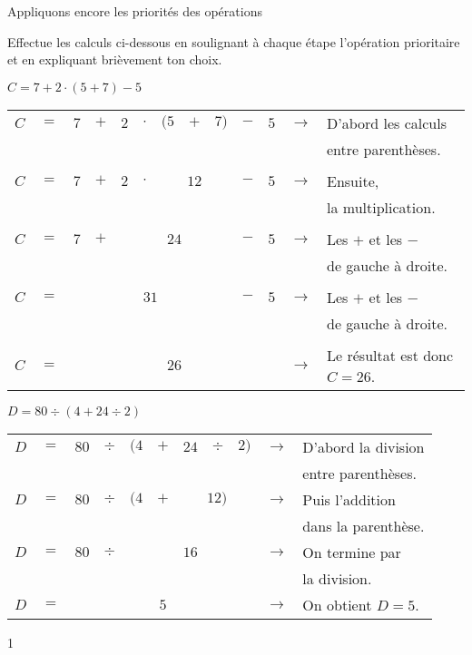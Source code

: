 \documentclass[a4paper,11pt]{report}
\begin{document}
\newpage

\begin{resolu}{Appliquons encore les priorités des opérations}
{
Effectue les calculs ci-dessous en soulignant à chaque étape l'opération prioritaire et en expliquant brièvement ton choix.
\vspace{-0.5cm}
\begin{tasks}[after-item-skip = 0.2em, after-skip=-1em]
    \task  $C=7+2\cdot (5+7)-5$
\vspace{-0.3cm}
{\color{blue}
\begin{center}
\begin{tabular}{|ccccccccccc|cp{5cm}|}\hline
$C$&$=$&$7$&$+$&$2$&$\cdot$&$(5$&$+$&$7)$&$-$&$5$&$\rightarrow$& D'abord les calculs \\\cline{7-9}
& & & & & & & & & & & &  entre parenthèses.\\
& & & & & & & & & & & & \\
$C$&$=$&$7$&$+$&$2$&$\cdot$&\multicolumn{3}{c}{$12$}&$-$&$5$&$\rightarrow$& Ensuite,\\
\cline{5-8}
& & & & & & & & & & & &  la multiplication.\\
& & & & & & & & & & & & \\
$C$&$=$&$7$&$+$&\multicolumn{5}{c}{$24$}&$-$&$5$&$\rightarrow$&  Les $+$ et les $-$\\
\cline{3-7}
& & & & & & & & & & & & de gauche à droite.\\
& & & & & & & & & & & & \\
$C$&$=$&\multicolumn{7}{c}{$31$}&$-$&$5$&$\rightarrow$&  Les $+$ et les $-$\\
\cline{6-11}
& & & & & & & & & & & &  de gauche à droite.\\
& & & & & & & & & & & & \\
$C$&$=$&\multicolumn{9}{c|}{$26$}&$\rightarrow$&  Le résultat est donc $C=26$.\\\hline
\end{tabular}
\end{center}}
\task $D=80\div (4+24\div 2)$
\vspace{-0.3cm}
\begin{center}
\begin{tabular}{|ccccccccc|cp{5cm}|}\hline
$D$&$=$&$80$&$\div $&$(4$&$+$&$24$& $\div $ & $2)$&$\rightarrow$ & D'abord la division \\\cline{7-9}
& & & & & & & & & &entre parenthèses.\\
$D$&$=$&$80$&$\div $&$(4$&$+$&\multicolumn{3}{c|}{$12)$}&$\rightarrow$& Puis l'addition  \\\cline{5-8}
& & & & & & & & & &dans la parenthèse.\\
$D$&$=$&$80$&$\div $&\multicolumn{5}{c|}{$16$}&$\rightarrow$& On termine par  \\\cline{3-7}
& & & & & & & & & &la division.\\
$D$&$=$&\multicolumn{7}{c|}{$5$}&$\rightarrow$& On obtient $D=5$. \\\hline
\end{tabular}
\end{center}
\end{tasks}
}{1}
\end{resolu}
\end{document}
